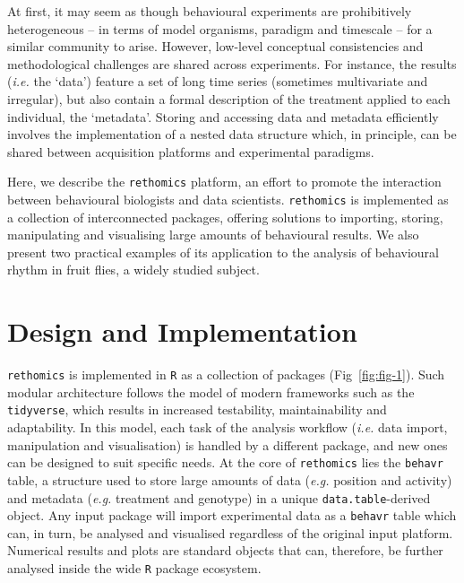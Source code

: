 \documentclass[10pt,letterpaper]{article}\usepackage[]{graphicx}\usepackage[]{color}
\begin{document}
At first, it may seem as though behavioural experiments are prohibitively heterogeneous -- in terms of model organisms, paradigm and timescale -- for a similar community to arise.
However, low-level conceptual consistencies and methodological challenges are shared across experiments.
For instance, the results (\emph{i.e.} the `data')  feature a set of long time series (sometimes multivariate and irregular), but also contain a formal description of the treatment applied to each individual, the `metadata'.
Storing and accessing data and metadata efficiently involves the implementation of a nested data structure which, in principle,
can be shared between acquisition platforms and experimental paradigms.

Here, we describe the \texttt{rethomics} platform, an effort to promote the interaction between behavioural biologists and data scientists.
\texttt{rethomics} is implemented as a collection of interconnected packages, offering solutions to importing, storing, manipulating and visualising large amounts of behavioural results.
We also present two practical examples of its application to the analysis of behavioural rhythm in fruit flies, a widely studied subject.


\section*{Design and Implementation}
\texttt{rethomics} is implemented in \texttt{R}\cite{r_core_team_r_2017}
as a collection of packages (Fig~\ref{fig:fig-1}).
Such modular architecture follows the model of modern frameworks such as the \texttt{tidyverse}\cite{wickham_tidyverse_2017}, which results in increased testability, maintainability and adaptability.
In this model, each task of the analysis workflow (\emph{i.e.} data import, manipulation and visualisation) is handled by a different package, and new ones can be designed to suit specific needs.
At the core of \texttt{rethomics} lies the \texttt{behavr} table, a structure used to store large amounts of data (\emph{e.g.} position and activity) and metadata (\emph{e.g.} treatment and genotype) in a unique \texttt{data.table}-derived object\cite{dowle_data.table_2017}.
Any input package will import experimental data as a \texttt{behavr} table which can, in turn, be analysed and visualised regardless of the original input platform.
Numerical results and plots are standard objects that can, therefore, be further analysed inside the wide \texttt{R} package ecosystem.

\end{document}
